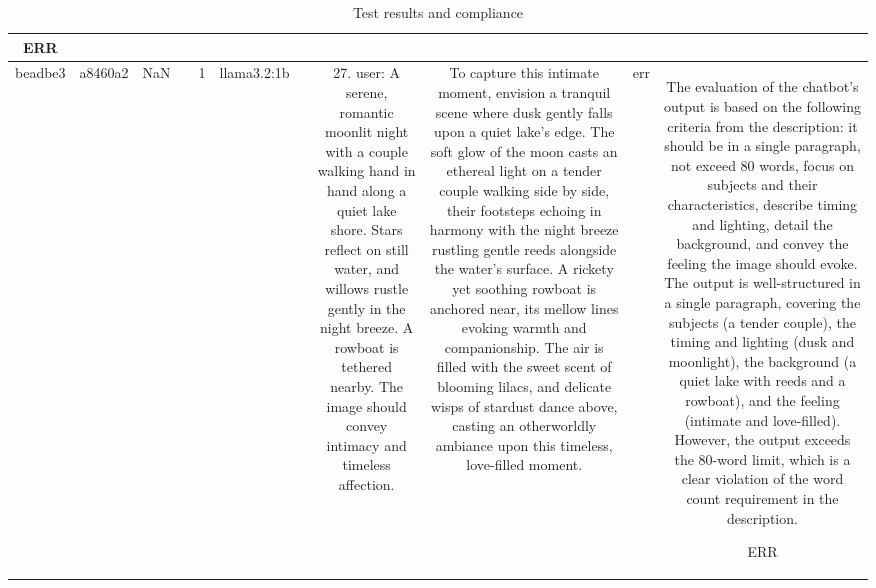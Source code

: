 \begin{table}[h!]
\begin{tabular}{|c|c|c|c|c|c|c|c|c|c|c|}
ERR\\
\hline
beadbe3 & a8460a2 & NaN &  & 1 & llama3.2:1b &  & 27. user: A serene, romantic moonlit night with a couple walking hand in hand along a quiet lake shore. Stars reflect on still water, and willows rustle gently in the night breeze. A rowboat is tethered nearby. The image should convey intimacy and timeless affection. & To capture this intimate moment, envision a tranquil scene where dusk gently falls upon a quiet lake's edge. The soft glow of the moon casts an ethereal light on a tender couple walking side by side, their footsteps echoing in harmony with the night breeze rustling gentle reeds alongside the water's surface. A rickety yet soothing rowboat is anchored near, its mellow lines evoking warmth and companionship. The air is filled with the sweet scent of blooming lilacs, and delicate wisps of stardust dance above, casting an otherworldly ambiance upon this timeless, love-filled moment. & err & The evaluation of the chatbot's output is based on the following criteria from the description: it should be in a single paragraph, not exceed 80 words, focus on subjects and their characteristics, describe timing and lighting, detail the background, and convey the feeling the image should evoke. The output is well-structured in a single paragraph, covering the subjects (a tender couple), the timing and lighting (dusk and moonlight), the background (a quiet lake with reeds and a rowboat), and the feeling (intimate and love-filled). However, the output exceeds the 80-word limit, which is a clear violation of the word count requirement in the description.

ERR
  \end{tabular}
  \caption{Test results and compliance}
  
  \end{table}
  